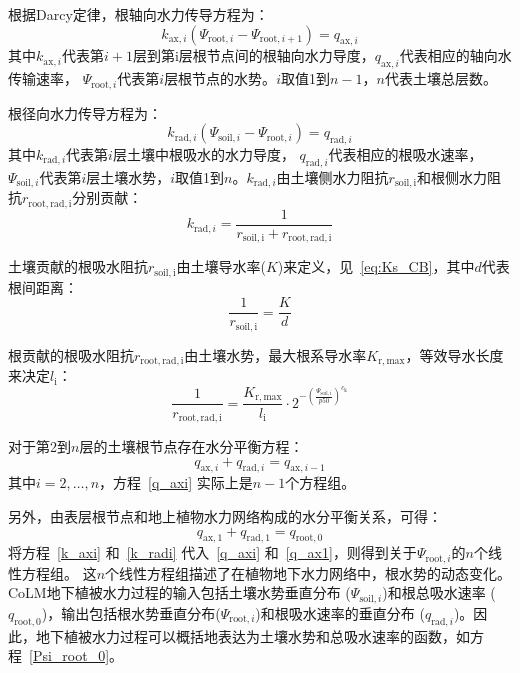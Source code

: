 根据Darcy定律，根轴向水力传导方程为：
\begin{equation}\label{k_axi}
  k_{\mathrm{ax},i}\left(\Psi_{\mathrm{root},i}-\Psi_{\mathrm{root},i+1}\right)=q_{\mathrm{ax},i}
\end{equation}
其中$k_{\mathrm{ax},i}$代表第$i+1$层到第i层根节点间的根轴向水力导度，$q_{\mathrm{ax},i}$代表相应的轴向水传输速率，
$\Psi_{\mathrm{root},i}$代表第$i$层根节点的水势。$i$取值1到$n-1$，$n$代表土壤总层数。

根径向水力传导方程为：
\begin{equation}\label{k_radi}
  k_{\mathrm{rad},i}\left(\Psi_{\mathrm{soil},i}-\Psi_{\mathrm{root},i}\right)=q_{\mathrm{rad},i}
\end{equation}
其中$k_{\mathrm{rad},i}$代表第$i$层土壤中根吸水的水力导度，
$q_{\mathrm{rad},i}$代表相应的根吸水速率，$\Psi_{\mathrm{soil},i}$代表第$i$层土壤水势，$i$取值1到$n$。$k_{\mathrm{rad},i}$由土壤侧水力阻抗$r_{\mathrm{soil,i}}$和根侧水力阻抗$r_{\mathrm{root,rad,i}}$分别贡献：
\begin{equation}\label{k_radi_r}
    k_{\mathrm{rad},i}=\frac{1}{r_{\mathrm{soil,i}}+r_{\mathrm{root,rad,i}}}
\end{equation}

土壤贡献的根吸水阻抗$r_{\mathrm{soil,i}}$由土壤导水率($K$)来定义，见~\eqref{eq:Ks_CB}，其中$d$代表根间距离：
\begin{equation}
    \frac{1}{r_{\mathrm{soil,i}}}=\frac{K}{d}
\end{equation}

根贡献的根吸水阻抗$r_{\mathrm{root,rad,i}}$由土壤水势，最大根系导水率$K_{\mathrm{r,max}}$，等效导水长度来决定$l_{\mathrm{i}}$：
\begin{equation}
    \frac{1}{r_{\mathrm{root,rad,i}}}=\frac{K_{\mathrm{r,max}}}{l_{\mathrm{i}}}\cdot 2^{-\left(\frac{\Psi_{\mathrm{soil,i}}}{p50}\right)^{c_{\mathrm{k}}}}
\end{equation}

对于第2到$n$层的土壤根节点存在水分平衡方程：
\begin{equation}\label{q_axi}
  q_{\mathrm{a x},i}+q_{\mathrm{r a d},i}=q_{\mathrm{a x}, i-1}
\end{equation}
其中$i=2, \ldots, n$，方程~\eqref{q_axi} 实际上是$n-1$个方程组。


另外，由表层根节点和地上植物水力网络构成的水分平衡关系，可得：
\begin{equation}\label{q_ax1}
  q_{\mathrm{ax,1}}+q_{\mathrm{rad, 1}}=q_{\mathrm{root,0}}
\end{equation}
将方程~\eqref{k_axi} 和~\eqref{k_radi} 代入~\eqref{q_axi} 和~\eqref{q_ax1}，则得到关于$ \Psi_{\mathrm{root},i}$的$n$个线性方程组。
这$n$个线性方程组描述了在植物地下水力网络中，根水势的动态变化。CoLM地下植被水力过程的输入包括土壤水势垂直分布 ($\Psi_{\mathrm{soil},i}$)和根总吸水速率 ($q_{\mathrm{root,0}}$)，输出包括根水势垂直分布($\Psi_{\mathrm{root},i}$)和根吸水速率的垂直分布 ($q_{\mathrm{rad},i}$)。因此，地下植被水力过程可以概括地表达为土壤水势和总吸水速率的函数，如方程~\eqref{Psi_root_0}。


